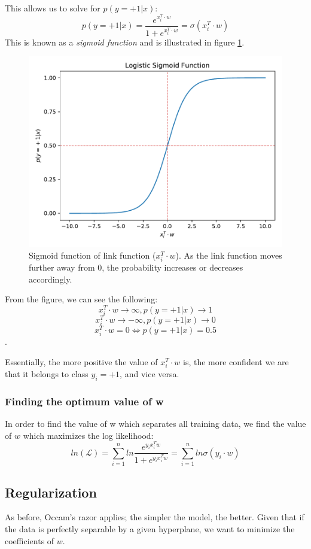 \documentclass[%
 reprint,
 amsmath,amssymb,
 aps,
]{revtex4-1}
\begin{document}
This allows us to solve for $p(y = +1|x)$:
\[
p(y = +1|x) = \frac{e^{x_{i}^T\cdot w}}{1 + e^{x_{i}^T\cdot w}} = \sigma(x_{i}^T\cdot w)
\]
This is known as a \textit{sigmoid function} and is illustrated in figure \ref{sigmoid}.
\begin{figure}
  \includegraphics[width=\linewidth]{../figs/sigmoid}
  \caption{Sigmoid function of link function ($x_{i}^T\cdot w$).
  As the link function moves further away from 0, the probability increases or decreases accordingly.
  }
  \label{sigmoid}
\end{figure}

From the figure, we can see the following:
\[x_{i}^T\cdot w \to \infty, p(y = +1|x) \to 1\]
\[x_{i}^T\cdot w \to -\infty, p(y = +1|x) \to 0\]
\[x_{i}^T\cdot w = 0 \Leftrightarrow p(y = +1|x) = 0.5\]. %


Essentially, the more positive the value of $x_{i}^T\cdot w$ is, the more confident we are that it belongs to class $y_i = +1$, and vice versa.


\subsubsection{Finding the optimum value of w}
In order to find the value of w which separates all training data, we find the value of $w$ which maximizes the log likelihood:
\[
ln(\mathcal{L}) = \sum_{i=1}^{n}ln \frac{e^{y_ix_i^Tw}}{1 + e^{y_ix_i^Tw}} = \sum_{i=1}^{n}ln \sigma(y_i\cdot w)
\]


\subsection{Regularization}
As before, Occam's razor applies; the simpler the model, the better.
Given that if the data is perfectly separable by a given hyperplane, we want to minimize the coefficients of $w$.
\end{document}
